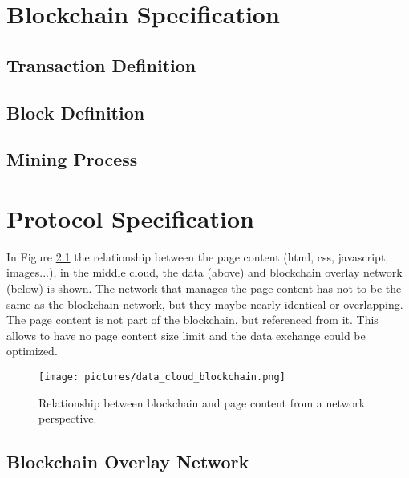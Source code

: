 \documentclass[12pt,fleqn]{book} %
\begin{document}

\chapter{Blockchain Specification}

\section{Transaction Definition}


\section{Block Definition}


\section{Mining Process}


\chapter{Protocol Specification}

In Figure \ref{fig:data_cloud_blockchain} the relationship between the page
content (html, css, javascript, images...), in the middle cloud, the data
(above) and blockchain overlay network (below) is shown. The network that
manages the page content has not to be the same as the blockchain network, but
they maybe nearly identical or overlapping. The page content is not part of
the blockchain, but referenced from it. This allows to have no page content
size limit and the data exchange could be optimized.

\begin{figure}[htp]
\centering
\texttt{[image: pictures/data\_cloud\_blockchain.png]}
\caption{Relationship between blockchain and page content from a network
perspective.}
\label{fig:data_cloud_blockchain}
\end{figure}

\section{Blockchain Overlay Network}

\end{document}
